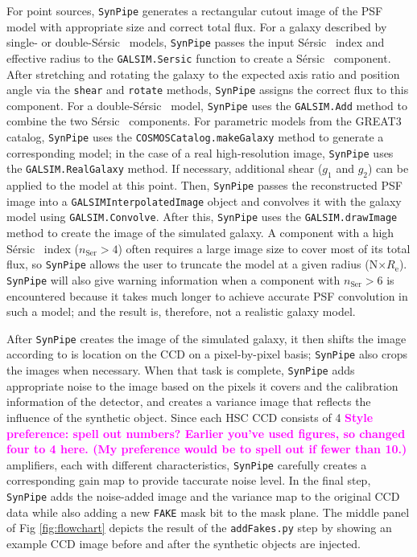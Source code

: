 \documentclass[useamsfonts]{pasj01}
\def\ser{{S\'{e}rsic\ }}
\def\synpipe{\texttt{SynPipe}}
\def\galsim{\texttt{G}{\scriptsize \texttt{AL}}\texttt{S}{\scriptsize \texttt{IM}}}
\newcommand{\susan}[1]{\textcolor{magenta} {\textbf{#1}}}
\begin{document}
    For point sources, \synpipe{} generates a rectangular cutout image of the PSF model
    with appropriate size and correct total flux.
    For a galaxy described by single- or double-\ser{} models, \synpipe{} passes the input
    \ser{} index and effective radius to the \galsim{}\texttt{.Sersic} function to
    create a \ser{} component.
    After stretching and rotating the galaxy to the expected axis ratio and position angle
    via the \texttt{shear} and \texttt{rotate} methods, \synpipe{} assigns the correct flux
    to this component.
    For a double-\ser{} model, \synpipe{} uses the \galsim{}\texttt{.Add} method to combine the two
    \ser{} components.
    For parametric models from the GREAT3 catalog, \synpipe{} uses the
    \texttt{COSMOSCatalog.makeGalaxy} method to generate a corresponding model; in the case of a real high-resolution image, \synpipe{} uses the \galsim{}\texttt{.RealGalaxy} method.
    If necessary, additional shear ($g_1$ and $g_2$) can be applied to the model at this
    point.
    Then, \synpipe{} passes the reconstructed PSF image into a
    \galsim{}\texttt{InterpolatedImage} object and convolves it with the galaxy model
    using \galsim{}\texttt{.Convolve}.
    After this, \synpipe{} uses the \galsim{}\texttt{.drawImage} method to create the image
    of the simulated galaxy.
    A component with a high \ser{} index ($n_{\mathrm{Ser}} > 4$) often requires a large image
    size to cover most of its total flux, so \synpipe{} allows the user to truncate the model
    at a given radius (N$\times R_{\mathrm{e}}$).
    \synpipe{} will also give warning information when a component with $n_{\mathrm{Ser}} > 6$ is
    encountered because it takes much longer to achieve accurate PSF convolution in such a model; and the result is, therefore, 
    not a realistic galaxy model.

 After \synpipe{} creates the image
    of the simulated galaxy, it then shifts the image according to is location on the
    CCD on a pixel-by-pixel basis; \synpipe{} also crops the images when necessary.
    When that task is complete, \synpipe{} adds appropriate noise to the image based on the pixels it
    covers and the calibration information of the detector, and creates a variance image
    that reflects the influence of the synthetic object.
    Since each HSC CCD consists of 4 \susan{Style preference: spell out numbers? Earlier you've used figures, so changed four to 4 here. (My preference would be to spell out if fewer than 10.)} amplifiers, each with different characteristics,
    \synpipe{} carefully creates a corresponding gain map to provide taccurate noise level.
    In the final step, \synpipe{} adds the noise-added image and the variance map to the original
    CCD data while also adding a new \texttt{FAKE} mask bit to the mask plane.
   The middle panel of Fig \ref{fig:flowchart} depicts the result of the
    \texttt{addFakes.py} step by showing an example CCD image before and after the
    synthetic objects are injected.
\end{document}
